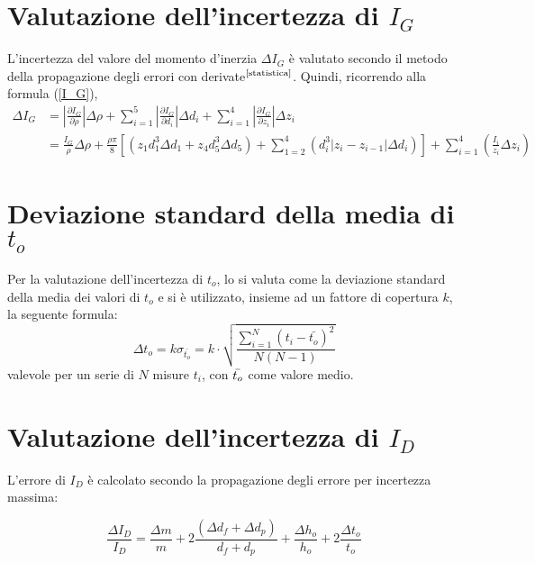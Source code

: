 \section{Valutazione dell'incertezza di $I_G$}
 \label{errore_I_G}
L'incertezza del valore del momento d'inerzia $\Delta I_G$ è valutato secondo il metodo della propagazione degli errori con derivate$^{\textrm{\cite{statistica}}}$.
Quindi, ricorrendo alla formula (\ref{I_G}),
    \begin{align*}
        \displaystyle \Delta I_G & = \left|\frac{\partial I_G}{\partial \rho}\right|\Delta \rho + \sum_{i=1}^5 \left|\frac{\partial I_G}{\partial d_i}\right|\Delta d_i + \sum_{i=1}^4 \left|\frac{\partial I_G}{\partial z_i}\right|\Delta z_i \\
        & = \frac{I_G}{\rho} \Delta \rho + \frac{\rho \pi}{8} \left[ \left(z_1 d_1^3 \Delta d_1 + z_4d_5^3 \Delta d_5\right) + \sum_{1=2}^4 \left( d_i^3 |z_i - z_{i-1}|\Delta d_i \right)\right] + \sum_{i=1}^4 \left( \frac{I_i}{z_i} \Delta z_i \right)
    \end{align*}
    
\section{Deviazione standard della media di $t_o$} \label{SD}

Per la valutazione dell'incertezza di $t_o$, lo si valuta come la deviazione standard della media dei valori di $t_o$ e si è utilizzato, insieme ad un fattore di copertura $k$, la seguente formula:
$$\displaystyle \Delta t_o = k \sigma_{\bar{t_o}} = k \cdot \sqrt{\frac{\displaystyle \sum_{i=1}^N (t_i - \bar{t_o})^2}{N(N-1)}}$$
valevole per un serie di $N$ misure $t_i$, con $\Bar{t_o}$ come valore medio.

\section{Valutazione dell'incertezza di $I_D$} \label{errore_I_D}
L'errore di $I_D$ è calcolato secondo la propagazione degli errore per incertezza massima:

$$\displaystyle \frac{\Delta I_D}{I_D} = \frac{\Delta m}{m} + 2\frac{(\Delta d_f + \Delta d_p)}{d_f + d_p} + \frac{\Delta h_o}{h_o} + 2\frac{\Delta t_o}{t_o}$$
